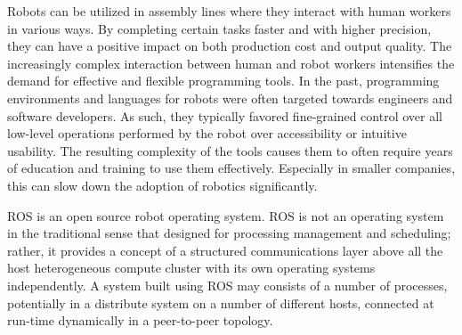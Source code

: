 Robots can be utilized in assembly lines where they interact with human workers in various ways\cite{Cashmore2015}. By completing certain tasks faster and with higher precision, they can have a positive impact on both production cost and output quality. The increasingly complex interaction between human and robot workers intensifies the demand for effective and flexible programming tools. In the past, programming environments and languages for robots were often targeted towards engineers and software developers. As such, they typically favored fine-grained control over all low-level operations performed by the robot over accessibility or intuitive usability. The resulting complexity of the tools causes them to often require years of education and training to use them effectively. Especially in smaller companies, this can slow down the adoption of robotics significantly.



ROS is an open source robot operating system\cite{quigley2009ros}. ROS is not an operating system in the traditional sense that designed for processing management and scheduling; rather, it provides a concept of a structured communications layer above all the host heterogeneous compute cluster with its own operating systems independently. A system built using ROS may consists of a number of processes, potentially in a distribute system on a number of different hosts, connected at run-time dynamically in a peer-to-peer topology.

